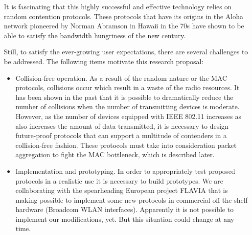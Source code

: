 \documentclass[a4paper,twocolumns]{article}%
\begin{document}
It is fascinating that this highly successful and effective technology relies on random contention protocols.
These protocols that have its origins in the Aloha network pioneered by Norman Abramson in Hawaii in the 70s have shown to be able to satisfy the bandwidth hungriness of the new century.

Still, to satisfy the ever-growing user expectations, there are several challenges to be addressed.
The following items motivate this research proposal:
\begin{itemize}
\item Collision-free operation.
As a result of the random nature or the MAC protocols, collisions occur which result in a waste of the radio resources.
It has been shown in the past that it is possible to dramatically reduce the number of collisions when the number of transmitting devices is moderate.
However, as the number of devices equipped with IEEE 802.11 increases as also increases the amount of data transmitted, it is necessary to design future-proof protocols that can support a multitude of contenders in a collision-free fashion.
These protocols must take into consideration packet aggregation to fight the MAC bottleneck, which is described later.
\item Implementation and prototyping.
In order to appropriately test proposed protocols in a realistic use it is necessary to build prototypes.
We are collaborating with the spearheading European project FLAVIA that is making possible to implement some new protocols in commercial off-the-shelf hardware (Broadcom WLAN interfaces).
Apparently it is not possible to implement our modifications, yet.
But this situation could change at any time.


\end{itemize}
\end{document}
